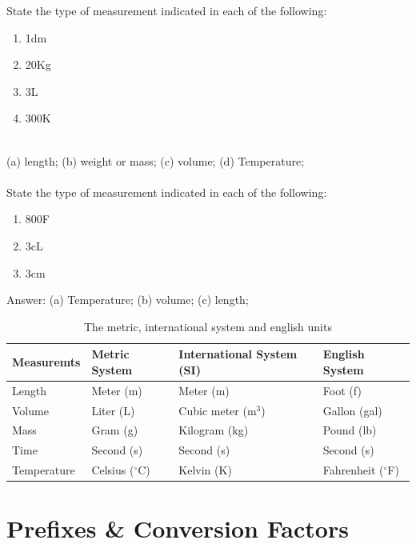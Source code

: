 \documentclass[main.tex]{subfiles}
\begin{document}
\begin{example} %
State the type of measurement indicated in each of the following:
\begin{multicols}{4}
\begin{enumerate}[label=(\alph*)]
\item 1dm
\item 20Kg
\item 3L
\item 300K
\end{enumerate}
\end{multicols}
\\
(a) length; (b) weight or mass; (c) volume; (d) Temperature; 
\\
\faDiamond\ \\
State the type of measurement indicated in each of the following:
\begin{multicols}{4}
\begin{enumerate}[label=(\alph*)]
\item 800F
\item 3cL
\item 3cm
\end{enumerate}
\end{multicols}
\flushright Answer: (a) Temperature; (b) volume; (c) length;
\end{example}%

\begin{table}[ht]
\centering
{}\selectfont
\begin{tabular}{llll}
\rowcolor{black!45}
\toprule
Measuremts & Metric System & International System (SI)& English System \\
\midrule
Length & Meter (m) & Meter (m)& Foot (f)\\
 Volume & Liter (L)  &  Cubic meter ($\text{m}^3$)& Gallon (gal) \\
   Mass & Gram (g)  &  Kilogram (kg)& Pound (lb)\\
  Time&  Second (s) & Second (s) &Second (s)  \\
 Temperature &Celsius ($^{\circ}$C)   & Kelvin (K)& Fahrenheit ($^{\circ}$F)  \\
\bottomrule
\end{tabular}
\caption{The metric, international system and english units}
\label{table1:1}
\end{table}

\section{Prefixes \& Conversion Factors}
\end{document}

